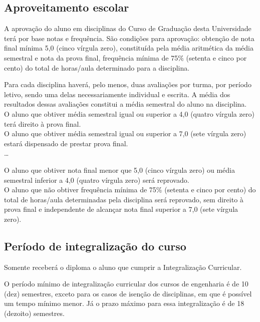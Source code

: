 \subsection{Aproveitamento escolar}
\begin{itquotation}
	\setcounter{artigo}{94}
	\artigo A aprovação do aluno em disciplinas do Curso de Graduação desta Universidade terá por base notas e frequência. São condições para aprovação: obtenção de nota final mínima 5,0 (cinco vírgula zero), constituída pela média aritmética da média semestral e nota da prova final, frequência mínima de 75\% (setenta e cinco por cento) do total de horas/aula determinado para a disciplina.

	\begin{paragrafos}
		\paragrafo Para cada disciplina haverá, pelo menos, duas avaliações por turma, por período letivo, sendo uma delas necessariamente individual e escrita. A média dos resultados dessas avaliações constitui a média semestral do aluno na disciplina.\\
		\paragrafo O aluno que obtiver média semestral igual ou superior a 4,0 (quatro vírgula zero) terá direito à prova final.\\
		\paragrafo O aluno que obtiver média semestral igual ou superior a 7,0 (sete vírgula zero) estará dispensado de prestar prova final.\\
		\ldots

		\setcounter{paragrafo}{6}
		\paragrafo  O aluno que obtiver nota final menor que 5,0 (cinco vírgula zero) ou média semestral inferior a 4,0 (quatro vírgula zero) será reprovado.\\
		\paragrafo O aluno que não obtiver frequência mínima de 75\% (setenta e cinco por cento) do total de horas/aula determinadas pela disciplina será reprovado, sem direito à prova final e independente de alcançar nota final superior a 7,0 (sete vírgula zero).\\
	\end{paragrafos}

\end{itquotation}
\subsection{Período de integralização do curso}
\setcounter{artigo}{98}
\begin{itquotation}
	\artigo Somente receberá o diploma o aluno que cumprir a Integralização Curricular.
\end{itquotation}

O período mínimo de integralização curricular dos cursos de engenharia é de 10 (dez) semestres, exceto para os casos de isenção de disciplinas, em que é possível um tempo mínimo menor. Já o prazo máximo para essa integralização é de 18 (dezoito) semestres.
